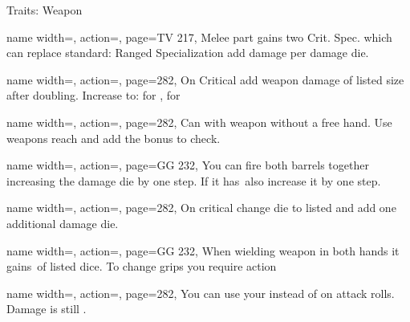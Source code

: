\begin{PageBack}
\begin{Tables}{\backTableHeight}
\begin{Table}{Traits: Weapon}
\begin{entry}{}{%
                name width=\conditionLength,%
                action=\CriticalFusion,
                page=TV 217,
            }
                Melee part gains two Crit. Spec. which can replace standard:  \hfill Ranged Specialization
                \hfill add  damage per damage die.\hfill{}
            \end{entry}
            \breakLine
            \begin{entry}{}{%
                name width=\conditionLength,%
                action=\Deadly,
                page=282,
            }
                On Critical add weapon damage of listed size after doubling. Increase to:  for ,  for 
            \end{entry}
            \begin{entry}{}{%
                name width=\conditionLength,%
                action=\Disarm,
                page=282,
            }
                Can  with weapon without a free hand. Use weapons reach and add the \Item bonus
                to check. \hfill
            \end{entry}
            \begin{entry}{}{%
                name width=\conditionLength,%
                action=\DoubleBarrel,
                page=GG 232,
            }
                You can fire both barrels together increasing the damage die by one step. If it has \Fatal\,also
                increase it by one step.
            \end{entry}
            \breakLine
            \begin{entry}{}{%
                name width=\conditionLength,%
                action=\Fatal,
                page=282,
            }
                On critical change die to listed and add one additional damage die.
            \end{entry}
            \begin{entry}{}{%
                name width=\conditionLength,%
                action=\FatalAim,
                page=GG 232,
            }
                When wielding weapon in both hands it gains \Fatal\,of listed dice. To change grips you require
                 action
            \end{entry}
            \begin{entry}{}{%
                name width=\conditionLength,%
                action=\Finesse,
                page=282,
            }
                You can use your \Dexterity instead of \Strength on attack rolls. Damage is still \Strength.

\end{entry}
\end{Table}
\end{Tables}
\end{PageBack}
